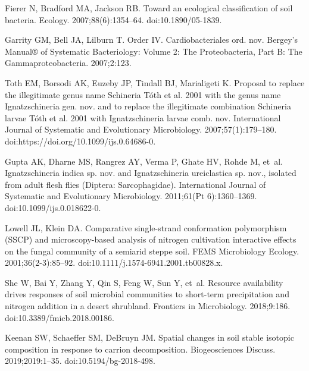 \documentclass[
  10pt,
  letterpaper,
]{article}
\begin{document}
\begin{thebibliography}{10}
  Fierer N, Bradford MA, Jackson RB.
  \newblock Toward an ecological classification of soil bacteria.
  \newblock Ecology. 2007;88(6):1354--64.
  \newblock doi:{10.1890/05-1839}.
  
  Garrity GM, Bell JA, Lilburn T.
  \newblock Order {IV}. {Cardiobacteriales} ord. nov.
  \newblock Bergey's Manual® of Systematic Bacteriology: Volume 2: The
    Proteobacteria, Part B: The Gammaproteobacteria. 2007;2:123.
  
  Toth EM, Borsodi AK, Euzeby JP, Tindall BJ, Marialigeti K.
  \newblock Proposal to replace the illegitimate genus name {Schineria} {Tóth}
    et al. 2001 with the genus name {Ignatzschineria} gen. nov. and to replace
    the illegitimate combination {Schineria} larvae {Tóth} et al. 2001 with
    {Ignatzschineria} larvae comb. nov.
  \newblock International Journal of Systematic and Evolutionary Microbiology.
    2007;57(1):179--180.
  \newblock doi:{https://doi.org/10.1099/ijs.0.64686-0}.
  
  Gupta AK, Dharne MS, Rangrez AY, Verma P, Ghate HV, Rohde M, et~al.
  \newblock Ignatzschineria indica sp. nov. and {Ignatzschineria} ureiclastica
    sp. nov., isolated from adult flesh flies ({Diptera}: {Sarcophagidae}).
  \newblock International Journal of Systematic and Evolutionary Microbiology.
    2011;61(Pt 6):1360--1369.
  \newblock doi:{10.1099/ijs.0.018622-0}.
  
  Lowell JL, Klein DA.
  \newblock Comparative single-strand conformation polymorphism ({SSCP}) and
    microscopy-based analysis of nitrogen cultivation interactive effects on the
    fungal community of a semiarid steppe soil.
  \newblock FEMS Microbiology Ecology. 2001;36(2-3):85--92.
  \newblock doi:{10.1111/j.1574-6941.2001.tb00828.x}.
  
  She W, Bai Y, Zhang Y, Qin S, Feng W, Sun Y, et~al.
  \newblock Resource availability drives responses of soil microbial communities
    to short-term precipitation and nitrogen addition in a desert shrubland.
  \newblock Frontiers in Microbiology. 2018;9:186.
  \newblock doi:{10.3389/fmicb.2018.00186}.
  
  Keenan SW, Schaeffer SM, DeBruyn JM.
  \newblock Spatial changes in soil stable isotopic composition in response to
    carrion decomposition.
  \newblock Biogeosciences Discuss. 2019;2019:1--35.
  \newblock doi:{10.5194/bg-2018-498}.
  

\end{thebibliography}
\end{document}
